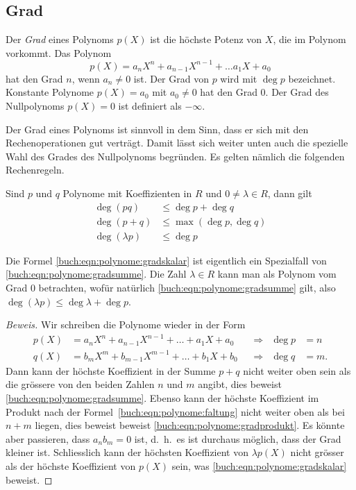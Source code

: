 %
%
\subsection{Grad
\label{buch:subsection:polynome:grad}}

\begin{definition}
Der {\em Grad} eines Polynoms $p(X)$ ist die höchste Potenz von $X$, die im
Polynom vorkommt.
Das Polynom
\[
p(X) = a_nX^n + a_{n-1}X^{n-1}+\dots a_1X + a_0
\]
hat den Grad $n$, wenn $a_n\ne 0$ ist.
Der Grad von $p$ wird mit $\deg p$ bezeichnet.
Konstante Polynome $p(X)=a_0$ mit $a_0\ne 0$ hat den Grad $0$.
Der Grad des Nullpolynoms $p(X)=0$ ist definiert als
$-\infty$.
\end{definition}

Der Grad eines Polynoms ist sinnvoll in dem Sinn, dass er sich mit
den Rechenoperationen gut verträgt.
Damit lässt sich weiter unten auch die spezielle Wahl des Grades
des Nullpolynoms begründen.
Es gelten nämlich die folgenden Rechenregeln.

\begin{lemma}
\label{lemma:rechenregelnfuerpolynomgrad}
Sind $p$ und $q$ Polynome mit Koeffizienten in $R$ und $0\ne \lambda\in R$,
dann gilt
\begin{align}
\deg(pq) &\le \deg p + \deg q
\label{buch:eqn:polynome:gradsumme}
\\
\deg(p+q) &\le \max(\deg p, \deg q)
\label{buch:eqn:polynome:gradprodukt}
\\
\deg(\lambda p) &\le \deg p
\label{buch:eqn:polynome:gradskalar}
\end{align}
\end{lemma}

Die Formel \eqref{buch:eqn:polynome:gradskalar} ist eigentlich
ein Spezialfall von \eqref{buch:eqn:polynome:gradsumme}.
Die Zahl $\lambda\in R$ kann man als Polynom vom Grad $0$ betrachten,
wofür natürlich \eqref{buch:eqn:polynome:gradsumme} gilt, also
$\deg(\lambda p) \le \deg\lambda + \deg p$.

\begin{proof}[Beweis]
Wir schreiben die Polynome wieder in der Form
\begin{align*}
p(X) &= a_nX^n + a_{n-1}X^{n-1} + \dots + a_1X + a_0&&\Rightarrow&\deg p&=n\\
q(X) &= b_mX^m + b_{m-1}X^{m-1} + \dots + b_1X + b_0&&\Rightarrow&\deg q&=m.
\end{align*}
Dann kann der höchste Koeffizient in der Summe $p+q$ nicht weiter oben
sein als die grössere von den beiden Zahlen $n$ und $m$ angibt, dies
beweist \eqref{buch:eqn:polynome:gradsumme}.
Ebenso kann der höchste Koeffizient im Produkt nach der
Formel~\eqref{buch:eqn:polynome:faltung} nicht weiter oben als bei
$n+m$ liegen, dies beweist
beweist \eqref{buch:eqn:polynome:gradprodukt}.
Es könnte aber passieren, dass $a_nb_m=0$ ist, d.~h.~es ist durchaus möglich,
dass der Grad kleiner ist.
Schliesslich kann der höchsten Koeffizient von $\lambda p(X)$ nicht grösser
als der höchste Koeffizient von $p(X)$ sein, was
\eqref{buch:eqn:polynome:gradskalar} beweist.
\end{proof}

